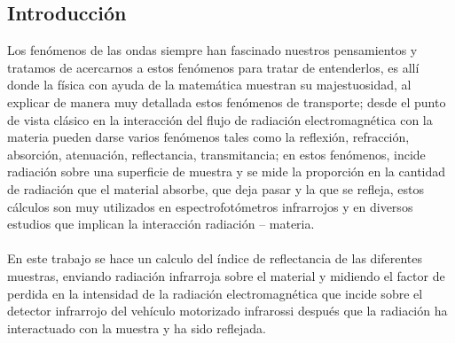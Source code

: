 \documentclass[12]{article}
\begin{document}
\begin{multicols}{2}
\section{Introducción}
Los fenómenos de las ondas siempre han fascinado nuestros pensamientos y tratamos de acercarnos a estos fenómenos para tratar de entenderlos, es allí donde la física con ayuda de la matemática muestran su majestuosidad, al explicar de manera muy detallada estos fenómenos de transporte; desde el punto de vista clásico en la interacción del flujo de radiación electromagnética con la materia pueden darse varios fenómenos tales como la reflexión, refracción, absorción, atenuación, reflectancia, transmitancia; en estos fenómenos, incide radiación sobre una superficie de muestra y se mide la proporción en la cantidad de radiación que el material absorbe, que deja pasar y la que se refleja, estos cálculos son muy utilizados en espectrofotómetros infrarrojos y en diversos estudios que implican la interacción radiación – materia.   \\\\
En este trabajo se hace un calculo del índice de  reflectancia de las diferentes muestras, enviando radiación infrarroja sobre el material y midiendo el factor de perdida en la intensidad de la radiación electromagnética que incide sobre el detector infrarrojo del vehículo motorizado infrarossi después  que la radiación ha interactuado con la muestra y ha sido reflejada.

\end{multicols}
\end{document}
